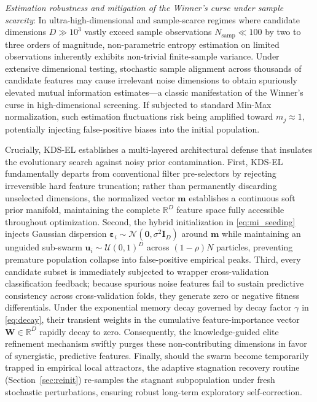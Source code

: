 \textit{Estimation robustness and mitigation of the Winner's curse under sample scarcity}: In ultra-high-dimensional and sample-scarce regimes where candidate dimensions $D \gg 10^3$ vastly exceed sample observations $N_{\mathrm{samp}} \ll 100$ by two to three orders of magnitude, non-parametric entropy estimation on limited observations inherently exhibits non-trivial finite-sample variance. Under extensive dimensional testing, stochastic sample alignment across thousands of candidate features may cause irrelevant noise dimensions to obtain spuriously elevated mutual information estimates---a classic manifestation of the Winner's curse in high-dimensional screening. If subjected to standard Min-Max normalization, such estimation fluctuations risk being amplified toward $m_j \approx 1$, potentially injecting false-positive biases into the initial population.

Crucially, KDS-EL establishes a multi-layered architectural defense that insulates the evolutionary search against noisy prior contamination. First, KDS-EL fundamentally departs from conventional filter pre-selectors by rejecting irreversible hard feature truncation; rather than permanently discarding unselected dimensions, the normalized vector $\mathbf{m}$ establishes a continuous soft prior manifold, maintaining the complete $\mathbb{R}^D$ feature space fully accessible throughout optimization. Second, the hybrid initialization in \eqref{eq:mi_seeding} injects Gaussian dispersion $\boldsymbol{\varepsilon}_i \sim \mathcal{N}(\mathbf{0}, \sigma^2 \mathbf{I}_D)$ around $\mathbf{m}$ while maintaining an unguided sub-swarm $\mathbf{u}_i \sim \mathcal{U}(0, 1)^D$ across $(1 - \rho)N$ particles, preventing premature population collapse into false-positive empirical peaks. Third, every candidate subset is immediately subjected to wrapper cross-validation classification feedback; because spurious noise features fail to sustain predictive consistency across cross-validation folds, they generate zero or negative fitness differentials. Under the exponential memory decay governed by decay factor $\gamma$ in \eqref{eq:decay}, their transient weights in the cumulative feature-importance vector $\mathbf{W} \in \mathbb{R}^D$ rapidly decay to zero. Consequently, the knowledge-guided elite refinement mechanism swiftly purges these non-contributing dimensions in favor of synergistic, predictive features. Finally, should the swarm become temporarily trapped in empirical local attractors, the adaptive stagnation recovery routine (Section~\ref{sec:reinit}) re-samples the stagnant subpopulation under fresh stochastic perturbations, ensuring robust long-term exploratory self-correction.

